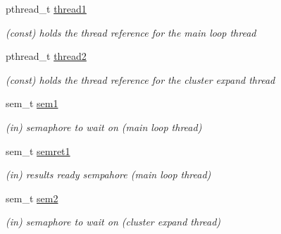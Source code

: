 \begin{DoxyCompactItemize}
\mbox{\label{structdbscan__pt_a2535cf2a4899d30b008b26dfa92bd44c}} 
pthread\+\_\+t \mbox{\hyperlink{structdbscan__pt_a2535cf2a4899d30b008b26dfa92bd44c}{thread1}}
\begin{DoxyCompactList}\small\item\em (const) holds the thread reference for the main loop thread \end{DoxyCompactList}\item 
\mbox{\label{structdbscan__pt_a4c0ec8c2730f9a56a4b186692de79c47}} 
pthread\+\_\+t \mbox{\hyperlink{structdbscan__pt_a4c0ec8c2730f9a56a4b186692de79c47}{thread2}}
\begin{DoxyCompactList}\small\item\em (const) holds the thread reference for the cluster expand thread \end{DoxyCompactList}\item 
\mbox{\label{structdbscan__pt_a716ce695e04d99f1e045fb9de1fb70f0}} 
sem\+\_\+t \mbox{\hyperlink{structdbscan__pt_a716ce695e04d99f1e045fb9de1fb70f0}{sem1}}
\begin{DoxyCompactList}\small\item\em (in) semaphore to wait on (main loop thread) \end{DoxyCompactList}\item 
\mbox{\label{structdbscan__pt_af4a16a1139b3ee7e1dfcec9d415a8855}} 
sem\+\_\+t \mbox{\hyperlink{structdbscan__pt_af4a16a1139b3ee7e1dfcec9d415a8855}{semret1}}
\begin{DoxyCompactList}\small\item\em (in) results ready sempahore (main loop thread) \end{DoxyCompactList}\item 
\mbox{\label{structdbscan__pt_a5123f8b35d2933f40d493fe31dc062c5}} 
sem\+\_\+t \mbox{\hyperlink{structdbscan__pt_a5123f8b35d2933f40d493fe31dc062c5}{sem2}}
\begin{DoxyCompactList}\small\item\em (in) semaphore to wait on (cluster expand thread) \end{DoxyCompactList}\item 
\mbox{\label{structdbscan__pt_a229860660f580c96e3f00820dedc314f}} 

\end{DoxyCompactItemize}
